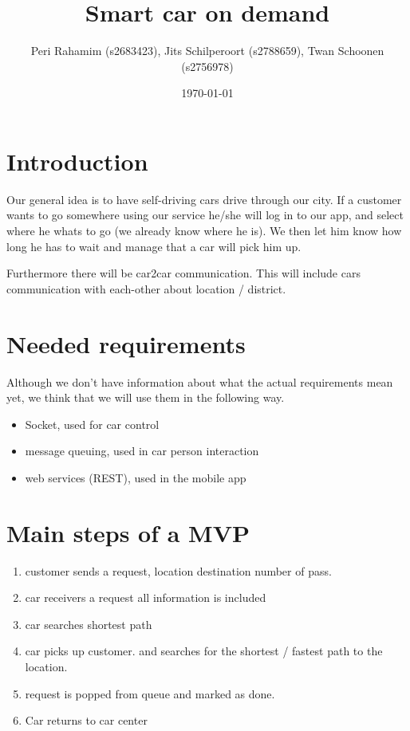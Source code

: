 \documentclass[8pt]{article}
\title{Smart car on demand}
\author{Peri Rahamim (s2683423),
  Jits Schilperoort (s2788659),
  Twan Schoonen (s2756978)}
\date{\today}
\begin{document}
\maketitle

\section{Introduction}

Our general idea is to have self-driving cars drive through our city.
If a customer wants to go somewhere using our service he/she will log in to our app, and select where he whats to go (we already know where he is).
We then let him know how long he has to wait and manage that a car will pick him up.

Furthermore there will be car2car communication. This will include cars communication with each-other about location / district.

\section{Needed requirements}
Although we don't have information about what the actual requirements mean yet, we think that we will use them in the following way.
\begin{itemize}[nolistsep]
\item Socket, used for car control
\item message queuing, used in car \- person interaction
\item web services (REST), used in the mobile app
\end{itemize}

\section{Main steps of a MVP}

\begin{enumerate}[nolistsep]
\item customer sends a request, location destination number of pass.
  
\item car receivers a request all information is included
  
\item car searches shortest path

\item car picks up customer. and searches for the shortest / fastest path to the location.

\item request is popped from queue and marked as done.

\item Car returns to car center

\end{enumerate}
\end{document}

